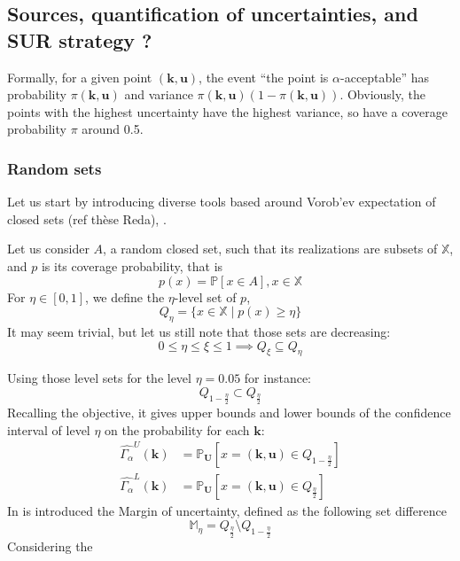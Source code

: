 \documentclass[a4paper,11pt]{article}
\newcommand{\Prob}{\mathbb{P}}
\newcommand{\Xspace}{\mathbb{X}}
\theoremstyle{defi}
\numberwithin{thmCounter}{section}
\begin{document}
\subsection{Sources, quantification of uncertainties, and SUR strategy ?}

Formally, for a given point $(\mathbf{k},\mathbf{u})$, the event ``the point is $\alpha$-acceptable'' has probability $\pi(\mathbf{k},\mathbf{u})$ and variance $\pi(\mathbf{k},\mathbf{u}) (1-\pi(\mathbf{k},\mathbf{u}))$. Obviously, the points with the highest uncertainty have the highest variance, so have a coverage probability $\pi$ around 0.5.

\subsubsection{Random sets}
Let us start by introducing diverse tools based around Vorob'ev expectation of closed sets (ref thèse Reda), \cite{heinrich_level_2012}.


Let us consider $A$, a random closed set, such that its realizations are subsets of $\Xspace$, and $p$ is its coverage probability, that is
\begin{equation}
  p(x) = \Prob\left[x\in A\right], x\in\Xspace
\end{equation}
For $\eta \in [0, 1]$, we define the $\eta$-level set of $p$,
\begin{equation}
  Q_{\eta} = \{x\in\Xspace \mid p(x) \geq \eta \}
\end{equation}
It may seem trivial, but let us still note that those sets are decreasing:
\begin{equation}
  0\leq \eta \leq \xi \leq 1 \implies Q_{\xi} \subseteq Q_{\eta}
\end{equation}

Using those level sets for the level $\eta=0.05$ for instance:
\begin{equation}
  Q_{1-\frac{\eta}{2}} \subset Q_{\frac{\eta}{2}}
\end{equation}
Recalling the objective, it gives upper bounds and lower bounds of the confidence interval of level $\eta$ on the probability for each $\mathbf{k}$:
\begin{align}
  \hat{\Gamma_{\alpha}}^{U}(\mathbf{k}) &= \Prob_\mathbf{U}\left[x=(\mathbf{k},\mathbf{u}) \in Q_{1-\frac{\eta}{2}}\right] \\
  \hat{\Gamma_{\alpha}}^{L}(\mathbf{k}) &= \Prob_\mathbf{U}\left[x=(\mathbf{k},\mathbf{u}) \in Q_{\frac{\eta}{2}}\right]
\end{align}
In \cite{dubourg_reliability-based_2011} is introduced the Margin of uncertainty, defined as the following set difference
\begin{equation}
  \mathbb{M}_{\eta} = Q_{\frac{\eta}{2}} \setminus Q_{1-\frac{\eta}{2}}
\end{equation}
Considering the 
\end{document}
